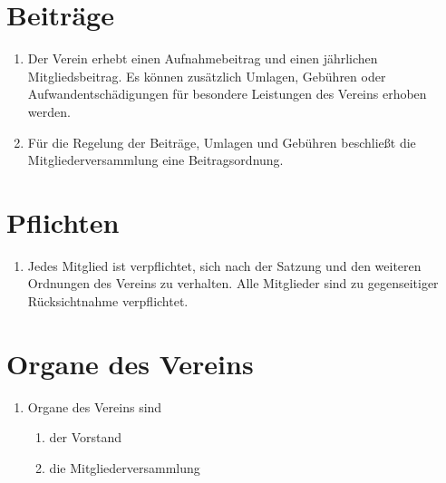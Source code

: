 \documentclass[a4paper,ngerman]{scrartcl}
\begin{document}
\section{Beiträge}
\begin{enumerate}
\item Der Verein erhebt einen Aufnahmebeitrag und einen jährlichen Mitgliedsbeitrag. Es können zusätzlich Umlagen, Gebühren oder Aufwandentschädigungen für besondere Leistungen des Vereins erhoben werden.
\item Für die Regelung der Beiträge, Umlagen und Gebühren beschließt die Mitgliederversammlung eine Beitragsordnung. \label{Beschluss einer Beitragsordnung}
\end{enumerate}

\section{Pflichten}
\begin{enumerate}
\item Jedes Mitglied ist verpflichtet, sich nach der Satzung und den weiteren Ordnungen des Vereins zu verhalten. Alle Mitglieder sind zu gegenseitiger Rücksichtnahme verpflichtet.
\end{enumerate}

\section{Organe des Vereins}
\begin{enumerate}
\item Organe des Vereins sind
\begin{enumerate}
\item der Vorstand
\item die Mitgliederversammlung
\end{enumerate}
\end{enumerate}
\end{document}
